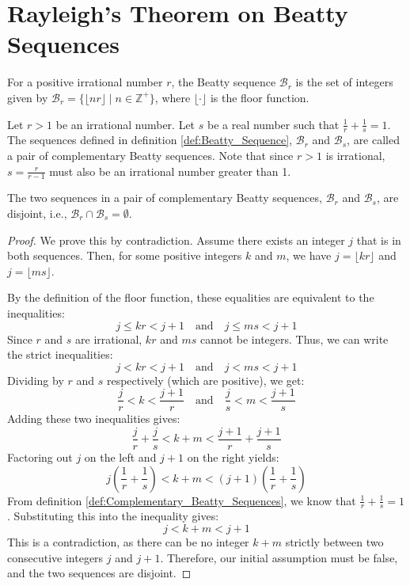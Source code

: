 
\chapter{Rayleigh's Theorem on Beatty Sequences}

\begin{definition}
    \label{def:Beatty_Sequence}
    For a positive irrational number $r$, the Beatty sequence $\mathcal{B}_r$ is the set of integers given by $\mathcal{B}_r = \{\lfloor nr \rfloor \mid n \in \mathbb{Z}^+\}$, where $\lfloor \cdot \rfloor$ is the floor function.
\end{definition}

\begin{definition}
    \label{def:Complementary_Beatty_Sequences}
    Let $r > 1$ be an irrational number. Let $s$ be a real number such that $\frac{1}{r} + \frac{1}{s} = 1$. The sequences defined in definition \ref{def:Beatty_Sequence}, $\mathcal{B}_r$ and $\mathcal{B}_s$, are called a pair of complementary Beatty sequences. Note that since $r>1$ is irrational, $s = \frac{r}{r-1}$ must also be an irrational number greater than 1.
\end{definition}

\begin{lemma}
    \label{lem:Disjointness}
    The two sequences in a pair of complementary Beatty sequences, $\mathcal{B}_r$ and $\mathcal{B}_s$, are disjoint, i.e., $\mathcal{B}_r \cap \mathcal{B}_s = \emptyset$.
\end{lemma}

\begin{proof}
    We prove this by contradiction. Assume there exists an integer $j$ that is in both sequences. Then, for some positive integers $k$ and $m$, we have $j = \lfloor kr \rfloor$ and $j = \lfloor ms \rfloor$.

    By the definition of the floor function, these equalities are equivalent to the inequalities:
    \[
    j \le kr < j+1 \quad \text{and} \quad j \le ms < j+1
    \]
    Since $r$ and $s$ are irrational, $kr$ and $ms$ cannot be integers. Thus, we can write the strict inequalities:
    \[
    j < kr < j+1 \quad \text{and} \quad j < ms < j+1
    \]
    Dividing by $r$ and $s$ respectively (which are positive), we get:
    \[
    \frac{j}{r} < k < \frac{j+1}{r} \quad \text{and} \quad \frac{j}{s} < m < \frac{j+1}{s}
    \]
    Adding these two inequalities gives:
    \[
    \frac{j}{r} + \frac{j}{s} < k+m < \frac{j+1}{r} + \frac{j+1}{s}
    \]
    Factoring out $j$ on the left and $j+1$ on the right yields:
    \[
    j\left(\frac{1}{r} + \frac{1}{s}\right) < k+m < (j+1)\left(\frac{1}{r} + \frac{1}{s}\right)
    \]
    From definition \ref{def:Complementary_Beatty_Sequences}, we know that $\frac{1}{r} + \frac{1}{s} = 1$. Substituting this into the inequality gives:
    \[
    j < k+m < j+1
    \]
    This is a contradiction, as there can be no integer $k+m$ strictly between two consecutive integers $j$ and $j+1$. Therefore, our initial assumption must be false, and the two sequences are disjoint.
\end{proof}

